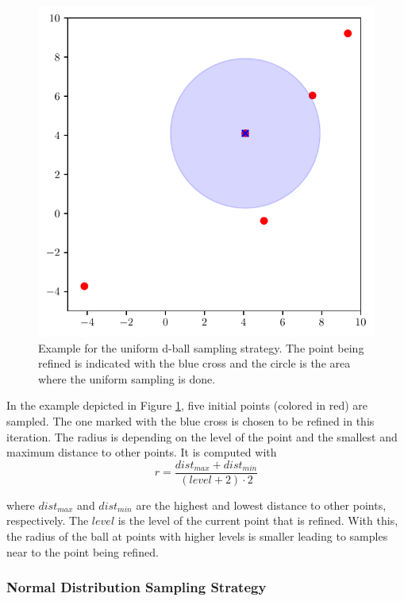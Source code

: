 \begin{figure}[htbp!]
	\centering
	\includegraphics[scale=0.8]{figures/Adaptive_random/Visualizations/Alternative_2}
	\caption{ Example for the uniform d-ball sampling strategy. The point being refined is indicated with the blue cross and the circle is the area where the uniform sampling is done. }
	\label{fig:alternative_2}
\end{figure}

In the example depicted in Figure \ref{fig:alternative_2}, five initial points (colored in red) are sampled. The one marked with the blue cross is chosen to be refined in this iteration. The radius is depending on the level of the point and the smallest and maximum distance to other points. It is computed with
\begin{equation}
	r = \frac{dist_{max} + dist_{min}}{(level+2)\cdot 2}
\end{equation}

where $ dist_{max} $ and $ dist_{min} $ are the highest and lowest distance to other points, respectively. The $ level $ is the level of the current point that is refined. With this, the radius of the ball at points with higher levels is smaller leading to samples near to the point being refined.

\subsubsection{Normal Distribution Sampling Strategy}


